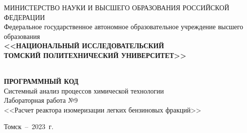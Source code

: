 \begin{titlepage}
	\begin{center}
\sffamily	\small{\MakeUppercase {Министерство науки и высшего образования
			Российской Федерации}}\\
		\footnotesize {Федеральное государственное автономное образовательное учреждение  высшего образования}\\
	\small	\MakeTextUppercase{\textbf{<<Национальный исследовательский} \\ \textbf{Томский политехнический университет>>}} \\
		\hrulefill
		\\[4cm]


		\bigskip

		{
			\Large \MakeUppercase{\textbf{Программный код}} \\

			Системный анализ процессов химической технологии \\
			Лабораторная работа №9 \\
			<<Расчет реактора изомеризации легких бензиновых фракций>>
			\
			 \bigskip



		}

\vspace{0.1\textheight}
\begin{minipage}{0.46\linewidth}
	\hfil
\end{minipage}



		\vfill
		Томск~--~2023~г.
	\end{center}

\end{titlepage}